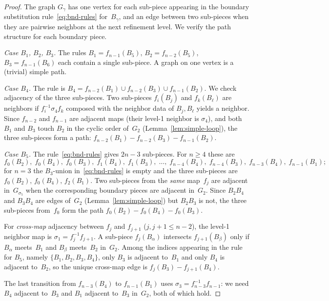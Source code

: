 \documentclass{amsart}
\theoremstyle{definition}
\theoremstyle{remark}
\begin{document}
\begin{proof}
The graph $G_\gamma$ has one vertex for each sub-piece appearing
in the boundary substitution rule~\eqref{eq:bnd-rules} for~$B_\gamma$,
and an edge between two sub-pieces when they are pairwise neighbors at
the next refinement level.  We verify the path structure for each
boundary piece.

\emph{Case $B_1$, $B_2$, $B_3$.}
The rules $B_1 = f_{n-1}(B_5)$,\; $B_2 = f_{n-2}(B_5)$,\;
$B_3 = f_{n-1}(B_6)$ each contain a single sub-piece.  A graph on one
vertex is a (trivial) simple path.

\emph{Case $B_4$.}
The rule is $B_4 = f_{n-2}(B_1) \cup f_{n-2}(B_3) \cup f_{n-1}(B_2)$.
We check adjacency of the three sub-pieces.  Two sub-pieces
$f_i(B_j)$ and $f_k(B_\ell)$ are neighbors if $f_i^{-1}\sigma_4 f_k$
composed with the neighbor data of $B_j, B_\ell$ yields a neighbor.
Since $f_{n-2}$ and $f_{n-1}$ are adjacent maps (their level-1
neighbor is $\sigma_4$), and both $B_1$ and $B_3$ touch $B_2$
in the cyclic order of~$G_2$ (Lemma~\ref{lem:simple-loop}), the
three sub-pieces form a path:
$f_{n-2}(B_1) - f_{n-2}(B_3) - f_{n-1}(B_2)$.

\emph{Case $B_5$.}
The rule~\eqref{eq:bnd-rules} gives $2n{-}3$ sub-pieces.  For $n \ge 4$
these are
\[
  f_0(B_2),\; f_0(B_4),\; f_0(B_3),\;
  f_1(B_4),\; f_1(B_3),\; \ldots,\;
  f_{n-4}(B_4),\; f_{n-4}(B_3),\;
  f_{n-3}(B_4),\; f_{n-1}(B_1);
\]
for $n = 3$ the $B_3$-union in~\eqref{eq:bnd-rules} is empty and the
three sub-pieces are $f_0(B_2),\, f_0(B_4),\, f_2(B_1)$.
Two sub-pieces from the \emph{same} map~$f_j$ are adjacent in~$G_{\sigma_5}$
when the corresponding boundary pieces are adjacent in~$G_2$.
Since $B_2 B_4$ and $B_3 B_4$ are edges of~$G_2$
(Lemma~\ref{lem:simple-loop}) but $B_2 B_3$ is not,
the three sub-pieces from~$f_0$ form the path
$f_0(B_2) - f_0(B_4) - f_0(B_3)$.

For \emph{cross-map} adjacency between $f_j$ and $f_{j+1}$
($j, j{+}1 \le n{-}2$), the level-1 neighbor map is
$\sigma_1 = f_j^{-1} f_{j+1}$.
A sub-piece $f_j(B_\alpha)$ intersects $f_{j+1}(B_\beta)$ only
if $B_\alpha$ meets~$B_1$ and $B_\beta$ meets~$B_2$ in~$G_2$.
Among the indices appearing in the rule for $B_5$, namely
$\{B_1, B_2, B_3, B_4\}$, only $B_3$ is adjacent to~$B_1$ and
only $B_4$ is adjacent to~$B_2$, so the unique cross-map edge is
$f_j(B_3) - f_{j+1}(B_4)$.

The last transition from $f_{n-3}(B_4)$ to $f_{n-1}(B_1)$ uses
$\sigma_3 = f_{n-3}^{-1}f_{n-1}$: we need $B_4$ adjacent to~$B_3$
and $B_1$ adjacent to~$B_3$ in~$G_2$, both of which hold.


\end{proof}
\end{document}
